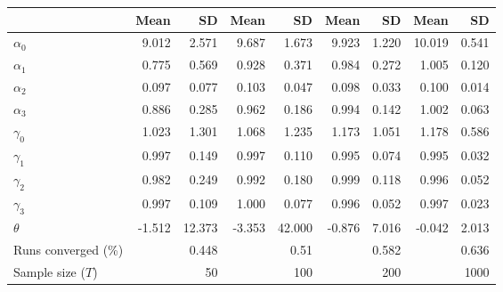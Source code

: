 
\begin{tabular}[t]{lrrrrrrrr}
\toprule
  & Mean & SD & Mean  & SD  & Mean   & SD   & Mean    & SD   \\
\midrule
$\alpha_{0}$ & 9.012 & 2.571 & 9.687 & 1.673 & 9.923 & 1.220 & 10.019 & 0.541\\
$\alpha_{1}$ & 0.775 & 0.569 & 0.928 & 0.371 & 0.984 & 0.272 & 1.005 & 0.120\\
$\alpha_{2}$ & 0.097 & 0.077 & 0.103 & 0.047 & 0.098 & 0.033 & 0.100 & 0.014\\
$\alpha_{3}$ & 0.886 & 0.285 & 0.962 & 0.186 & 0.994 & 0.142 & 1.002 & 0.063\\
$\gamma_{0}$ & 1.023 & 1.301 & 1.068 & 1.235 & 1.173 & 1.051 & 1.178 & 0.586\\
$\gamma_{1}$ & 0.997 & 0.149 & 0.997 & 0.110 & 0.995 & 0.074 & 0.995 & 0.032\\
$\gamma_{2}$ & 0.982 & 0.249 & 0.992 & 0.180 & 0.999 & 0.118 & 0.996 & 0.052\\
$\gamma_{3}$ & 0.997 & 0.109 & 1.000 & 0.077 & 0.996 & 0.052 & 0.997 & 0.023\\
$\theta$ & -1.512 & 12.373 & -3.353 & 42.000 & -0.876 & 7.016 & -0.042 & 2.013\\
Runs converged (\%) &  & 0.448 &  & 0.51 &  & 0.582 &  & 0.636\\
Sample size ($T$) &  & 50 &  & 100 &  & 200 &  & 1000\\
\bottomrule
\end{tabular}
